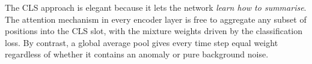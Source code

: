 The CLS approach is elegant because it lets the network \textit{learn how to summarise}. The attention mechanism in every encoder layer is free to aggregate any subset of positions into the CLS slot, with the mixture weights driven by the classification loss. By contrast, a global average pool gives every time step equal weight regardless of whether it contains an anomaly or pure background noise.

\newpage
